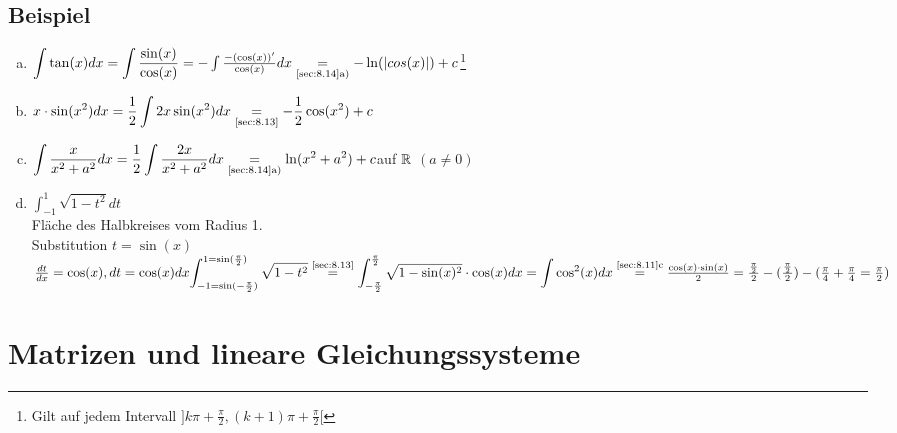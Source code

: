 \subsection{Beispiel}
\begin{enumerate}[a)]
\item ${\displaystyle \int \tan(x)dx = \int \frac{\sin(x)}{\cos(x)}} = - \int \frac{-(\cos(x))'}{\cos(x)}dx \underset{\text{\ref{sec:8.14}a)}}{=} - \ln(\lvert cos(x) \rvert) +c$\footnote{Gilt auf jedem Intervall $]k\pi + \frac{\pi}{2}, (k+1)\pi+\frac{\pi}{2}[$}
\item ${\displaystyle x \cdot \sin(x^2)dx = \frac{1}{2} \int 2x \sin(x^2)dx \underset{\text{\ref{sec:8.13}}}{=} - \frac{1}{2}\cos(x^2) +c}$
\item ${\displaystyle \int \frac{x}{x^2+a^2}dx = \frac{1}{2} \int \frac{2x}{x^2 + a^2}dx \underset{\text{\ref{sec:8.14}a)}}{=} \ln(x^2+a^2) + c}$auf $\mathbb{R}$ $(a \ne 0)$
\item ${\displaystyle \int_{-1}^{1} \sqrt{1-t^2}dt}$\\
Fläche des Halbkreises vom Radius 1.\\
Substitution $t = \sin(x)$\\
$\frac{dt}{dx} = \cos(x), dt = \cos(x)dx\\
{\displaystyle \int_{-1=\sin(-\frac{\pi}{2})}^{1= \sin(\frac{\pi}{2})}\sqrt{1-t^2} \overset{\text{\ref{sec:8.13}}}{=}\int_{-\frac{\pi}{2}}^{\frac{\pi}{2}}
\sqrt{1-\sin(x)^2} \cdot \cos(x)dx = \int\cos^2(x)}dx \overset{\text{\ref{sec:8.11}c}}{=} \frac{\cos(x) \cdot \sin(x)}{2} = \frac{\frac{\pi}{2}}{2} - (\frac{\frac{\pi}{2}}{2}) - (\frac{\pi}{4} + \frac{\pi}{4} = \frac{\pi}{2})$ 
\end{enumerate}
\begin{figure}[h!]
\centering
{}
\end{figure}
\section{Matrizen und lineare Gleichungssysteme}
